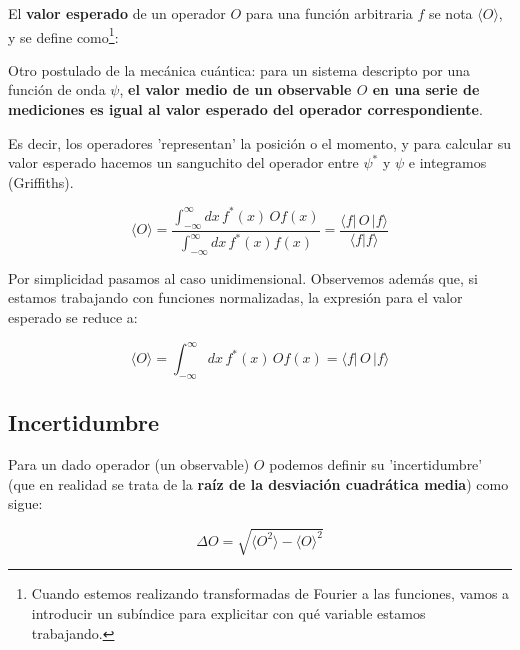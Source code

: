 El \textbf{valor esperado} de un operador $O$ para una función arbitraria $f$
se nota $\langle O \rangle$, y se define como\footnote{Cuando estemos realizando transformadas de Fourier a las funciones, vamos a introducir un subíndice para explicitar con qué variable estamos trabajando.}:

\begin{marginfigure}
\begin{qbox}{}
    Otro postulado de la mecánica cuántica: para un sistema descripto por una función de onda $\psi$, \textbf{el valor medio de un observable $O$ en una serie de mediciones es igual al valor esperado del operador correspondiente}.
\end{qbox}
\end{marginfigure}
\begin{marginfigure}
\begin{qbox}{}
    Es decir, los operadores 'representan' la posición o el momento, y para calcular su valor esperado hacemos un sanguchito del operador entre $\psi^*$ y $\psi$ e integramos (Griffiths).
\end{qbox}
\end{marginfigure}

\begin{equation}\label{vedef}
    \langle O \rangle =\frac{\int_{-\infty}^{\infty}dx\,f^*(x) \,O f(x)}{\int_{-\infty}^{\infty}dx \,f^*(x) f(x)}= \frac{\langle f |\,O\,|f\rangle}{\langle f|f\rangle}
\end{equation}

Por simplicidad pasamos al caso unidimensional. Observemos además que, si estamos trabajando con funciones normalizadas, la expresión para el valor esperado se reduce a:

\begin{equation}
    \langle O \rangle =\int_{-\infty}^{\infty}dx\,f^*(x) \,O f(x)= \langle f |\,O\,|f\rangle
\end{equation}

\subsection{\textbf{Incertidumbre}}

Para un dado operador (un observable) $O$ podemos definir su 'incertidumbre' (que en realidad se trata de la \textbf{raíz de la desviación cuadrática media}) como sigue:

\begin{equation}\label{incertdef}
    \Delta O=\sqrt{\langle O^2\rangle-\langle O \rangle^2}
\end{equation}


